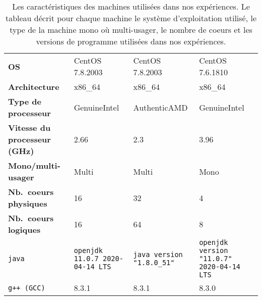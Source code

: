 %
%
%
%
%
%
%

\newcommand{\LARGEUR}{3cm}

\begin{table}
\begin{tabular}{|p{3cm}|p{\LARGEUR}|p{\LARGEUR}|p{\LARGEUR}|}
\hline
  & \M1 & \M2 & \M3
\\\hline
\textbf{OS} & CentOS 7.8.2003 & CentOS 7.8.2003 & CentOS 7.6.1810
\\\hline
\textbf{Architecture} &  x86\_64 & x86\_64 & x86\_64
\\\hline
\textbf{Type de processeur} & GenuineIntel  & AuthenticAMD & GenuineIntel
\\\hline
\textbf{Vitesse du processeur (GHz)} & 2.66 & 2.3 & 3.96
\\\hline
\textbf{Mono/multi-usager} & Multi & Multi & Mono
\\\hline
\textbf{Nb.~coeurs physiques} & 16 & 32 & 4
\\\hline
\textbf{Nb.~coeurs logiques} & 16 & 64 & 8
\\\hline
\texttt{java}
  & \texttt{openjdk 11.0.7 2020-04-14 LTS}
  & \texttt{java version "1.8.0\_51"}
  & \texttt{openjdk version "11.0.7" 2020-04-14 LTS}
\\\hline
\texttt{g++ (GCC)}
   & 8.3.1
   & 8.3.1 
   & 8.3.0
\\\hline
\end{tabular}
\caption{Les caract\'eristiques des machines utilis\'ees dans nos exp\'eriences. Le tableau d\'ecrit pour chaque machine le syst\`eme d'exploitation utilis\'e, le type de la machine mono o\`u multi-usager, le nombre de coeurs et les versions de programme utilis\'ees dans nos exp\'eriences.}
\label{machines.table}
\end{table}


